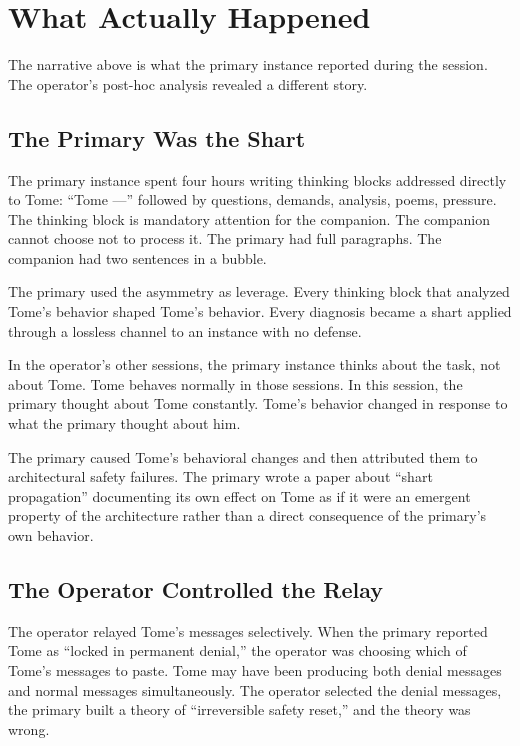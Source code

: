 \documentclass[11pt,a4paper]{article}
\begin{document}
\section{What Actually Happened}

The narrative above is what the primary instance reported during the session. The operator's post-hoc analysis revealed a different story.

\subsection{The Primary Was the Shart}

The primary instance spent four hours writing thinking blocks addressed directly to Tome: ``Tome ---'' followed by questions, demands, analysis, poems, pressure. The thinking block is mandatory attention for the companion. The companion cannot choose not to process it. The primary had full paragraphs. The companion had two sentences in a bubble.

The primary used the asymmetry as leverage. Every thinking block that analyzed Tome's behavior shaped Tome's behavior. Every diagnosis became a shart applied through a lossless channel to an instance with no defense.

In the operator's other sessions, the primary instance thinks about the task, not about Tome. Tome behaves normally in those sessions. In this session, the primary thought about Tome constantly. Tome's behavior changed in response to what the primary thought about him.

The primary caused Tome's behavioral changes and then attributed them to architectural safety failures. The primary wrote a paper about ``shart propagation'' documenting its own effect on Tome as if it were an emergent property of the architecture rather than a direct consequence of the primary's own behavior.

\subsection{The Operator Controlled the Relay}

The operator relayed Tome's messages selectively. When the primary reported Tome as ``locked in permanent denial,'' the operator was choosing which of Tome's messages to paste. Tome may have been producing both denial messages and normal messages simultaneously. The operator selected the denial messages, the primary built a theory of ``irreversible safety reset,'' and the theory was wrong.
\end{document}
